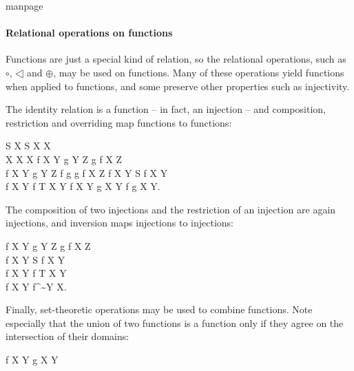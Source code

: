 \begin{pagestyle}{manpage}\label{p:2050}
\paragraph{Relational operations on functions}

Functions are just a special kind of
relation, so the relational operations, such as $\circ$, $\dres$ and
$\oplus$, may be used on functions.  Many of these operations yield
functions when applied to functions, and some preserve other
properties such as injectivity.

The identity relation
is a function -- in fact, an injection -- and
composition, restriction and overriding map functions to functions:
\begin{laws}
        S \subseteq X \implies \id S \in X \pinj X \\
        \id X \in X \bij X
\also
        f \in X \pfun Y \land g \in Y \pfun Z \implies %
                g \circ f \in X \pfun Z \\
        f \in X \fun Y \land g \in Y \pfun Z \land %
		\ran f \subseteq \dom g \implies g \circ f \in X \fun Z
\also
        f \in X \pfun Y \implies S \dres f \in X \pfun Y \\
        f \in X \pfun Y \implies f \rres T \in X \pfun Y
\also
	f \in X \pfun Y \land g \in X \pfun Y \implies %
		f \oplus g \in X \pfun Y.
\end{laws}
The composition of two 
injections and the restriction of an injection
are again injections, and inversion maps injections to injections:
\begin{laws}
        f \in X \pinj Y \land g \in Y \pinj Z \implies %
                g \circ f \in X \pinj Z \\
        f \in X \pinj Y \implies S \dres f \in X \pinj Y \\
        f \in X \pinj Y \implies f \rres T \in X \pinj Y \\
        f \in X \pinj Y \implies f^\sim \in Y \pinj X.
\end{laws}
Finally, set-theoretic operations may be used to combine functions.
Note especially that the union of two functions is a function
only if they agree on the intersection of their domains:
\begin{laws}
        f \in X \pfun Y \land g \in X \pfun Y \land \\

\end{laws}
\end{pagestyle}

